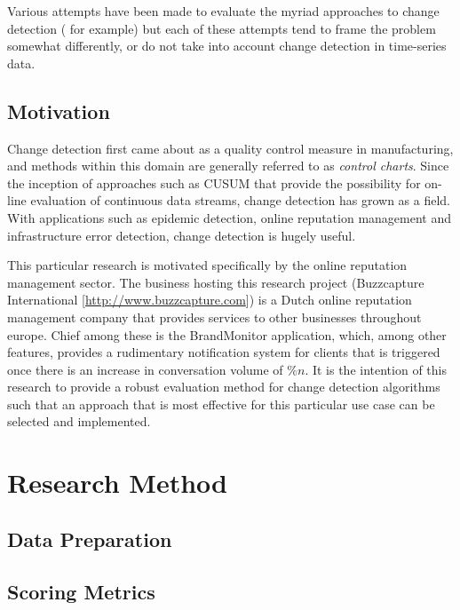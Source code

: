\documentclass{uvamscse}	%
\begin{document}
Various attempts have been made to evaluate the myriad approaches to change detection (\cite{Buntain2014} for example)
but each of these attempts tend to frame the problem somewhat differently, or do not take into account change detection
in time-series data.


\section{Motivation}

Change detection first came about as a quality control measure in manufacturing, and methods within this domain are generally
referred to as \emph{control charts}. Since the inception of approaches such as CUSUM that provide the possibility for
on-line evaluation of continuous data streams, change detection has grown as a field. With applications such as epidemic
detection, online reputation management and infrastructure error detection, change detection is hugely useful.

This particular research is motivated specifically by the online reputation management sector. The business hosting this
research project (Buzzcapture International [\url{http://www.buzzcapture.com}]) is a Dutch online reputation management 
company that provides services to other businesses throughout europe. Chief among these is the BrandMonitor application,
 which, among other features, provides a rudimentary notification system for clients that is triggered once there is an
 increase in conversation volume of \(\%n\). It is the intention of this research to provide a robust evaluation method
 for change detection algorithms such that an approach that is most effective for this particular use case can be 
 selected and implemented.

\chapter{Research Method}

\section{Data Preparation}

\section{Scoring Metrics}
\end{document}
